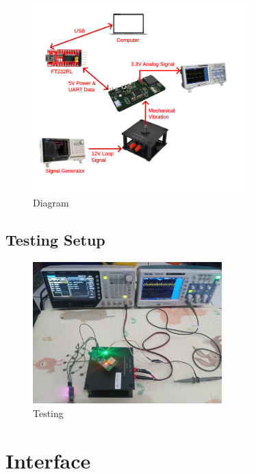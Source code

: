 \documentclass[a4paper,12pt,oneside,pdflatex,italian,final,twocolumn]{article}
\begin{document}
	\begin{figure}[h]
		\centering
		\includegraphics[width=0.75\textwidth]{images/testing.png}
		\caption{Diagram}
	\end{figure}

	\newpage
	\subsection{Testing Setup}

	\begin{figure}[h]
		\centering
		\includegraphics[width=0.65\textwidth]{images/testactual.jpg}
		\caption{Testing}
	\end{figure}

	\section{Interface}
\end{document}
